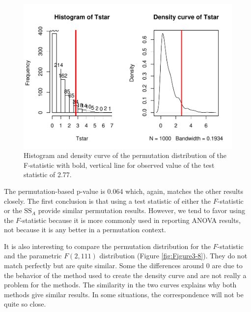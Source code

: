 \documentclass[]{book}
\begin{document}
\begin{figure}
\centering
\includegraphics{GreenwoodBanner_files/figure-latex/Figure3-7-1.pdf}
\caption{\label{fig:Figure3-7}Histogram and density curve of the permutation distribution
of the F-statistic with bold, vertical line for observed value of the
test statistic of 2.77.}
\end{figure}

The permutation-based p-value is 0.064 which, again, matches the other
results closely. The first conclusion is that using a test statistic of
either the \(F\)-statistic or the \(\text{SS}_A\) provide similar
permutation results. However, we tend to favor using the \(F\)-statistic
because it is more commonly used in reporting ANOVA results, not because
it is any better in a permutation context.

It is also interesting to compare the permutation distribution for the
\(F\)-statistic and the parametric \(F(2, 111)\) distribution (Figure
\ref{fig:Figure3-8}). They do not match perfectly but are quite similar.
Some the differences around 0 are due to the behavior of the method used
to create the density curve and are not really a problem for the
methods. The similarity in the two curves explains why both methods give
similar results. In some situations, the correspondence will not be
quite so close.
\end{document}

